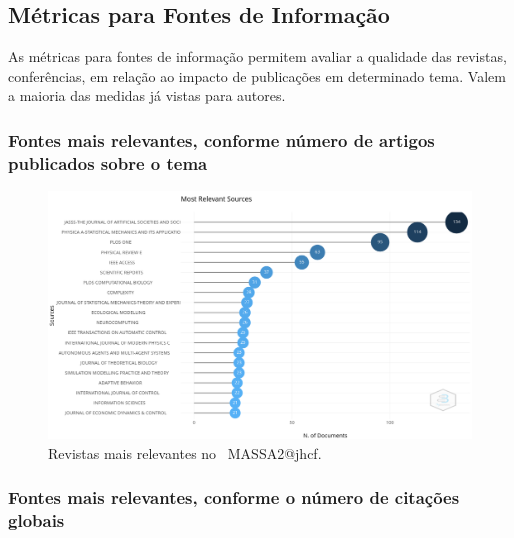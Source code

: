 \subsection{Métricas para Fontes de Informação}

As métricas para fontes de informação permitem avaliar a qualidade das revistas, conferências, em relação ao impacto de publicações em determinado tema. Valem a maioria das medidas já vistas para autores.

\subsubsection{Fontes mais relevantes, conforme número de artigos publicados sobre o tema}

\begin{figure}
    \centering
    \includegraphics[width=1\textwidth]{experiments/jhcf/PesqBibliogr/SimulacaoMultiagente/WoS-20220203/Metricas/Sources/MASSA2-Most-Relevant-Sources.png}
    \caption{Revistas mais relevantes no  \dataset\ MASSA2@jhcf.}
    \label{fig:MASSA2-Most-Relevant-Sources}
\end{figure}

\subsubsection{Fontes mais relevantes, conforme o número de citações globais}


